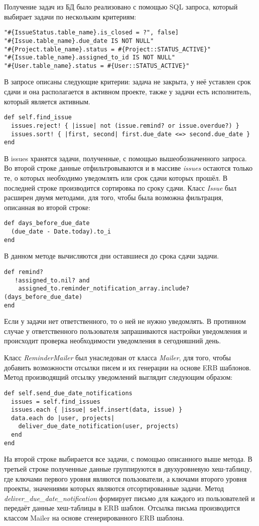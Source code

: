 Получение задач из БД было реализовано с помощью SQL запроса, который выбирает
задачи по нескольким критериям:
\small{\begin{lstlisting}
"#{IssueStatus.table_name}.is_closed = ?", false]
"#{Issue.table_name}.due_date IS NOT NULL"
"#{Project.table_name}.status = #{Project::STATUS_ACTIVE}"
"#{Issue.table_name}.assigned_to_id IS NOT NULL"
"#{User.table_name}.status = #{User::STATUS_ACTIVE}"
\end{lstlisting}}
В запросе описаны следующие критерии: задача не закрыта, у неё уставлен срок
сдачи и она располагается в активном проекте, также у задачи есть исполнитель,
который является активным. 
\small{\begin{lstlisting}
def self.find_issue
  issues.reject! { |issue| not (issue.remind? or issue.overdue?) }
  issues.sort! { |first, second| first.due_date <=> second.due_date }
end
\end{lstlisting}}
В issues хранятся задачи, полученные, с помощью вышеобозначенного запроса. Во
второй строке данные отфильтровываются и в массиве \textit{issues} остаются
только те, о которых необходимо уведомлять или срок сдачи которых прошёл. В
последней строке производится сортировка по сроку сдачи. Класс \textit{Issue}
был расширен двумя методами, для того, чтобы была возможна фильтрация,
описанная во второй строке:
\small{\begin{lstlisting}
def days_before_due_date
  (due_date - Date.today).to_i
end
\end{lstlisting}}
В данном методе вычисляются дни оставшиеся до срока сдачи задачи.
\small{\begin{lstlisting}
def remind?
   !assigned_to.nil? and
    assigned_to.reminder_notification_array.include?(days_before_due_date)
end
\end{lstlisting}}
Если у задачи нет ответственного, то о ней не нужно уведомлять. В противном
случае у ответственного пользователя запрашиваются настройки уведомления и
происходит проверка необходимости уведомления в сегодняшний день.

Класс \textit{ReminderMailer} был унаследован от класса \textit{Mailer}, для
того, чтобы добавить возможности отсылки писем и их генерации на основе ERB
шаблонов. Метод производящий отсылку уведомлений выглядит следующим образом:
\small{\begin{lstlisting}
def self.send_due_date_notifications
  issues = self.find_issues
  issues.each { |issue| self.insert(data, issue) }
  data.each do |user, projects|
    deliver_due_date_notification(user, projects)
  end
end
\end{lstlisting}}
На второй строке выбирается все задачи, с помощью описанного выше метода. В
третьей строке полученные данные группируются в двухуровневую хеш-таблицу, где
ключами первого уровня являются пользователи, а ключами второго уровня проекты,
значениями которых являются отсортированные задачи. Метод
\textit{deliver\_due\_date\_notification} формирует письмо для каждого из
пользователей и передаёт данные хеш-таблицы в ERB шаблон. Отсылка письма
производится классом Mailer на основе сгенерированного ERB шаблона.

